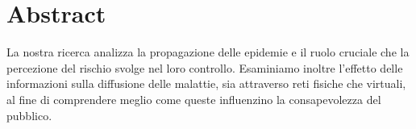 \section{Abstract}\label{sec:abstract}
    La nostra ricerca analizza la propagazione delle epidemie e il ruolo cruciale che la percezione del rischio svolge
    nel loro controllo.
    Esaminiamo inoltre l'effetto delle informazioni sulla diffusione delle malattie, sia attraverso reti fisiche che
    virtuali, al fine di comprendere meglio come queste influenzino la consapevolezza del pubblico.